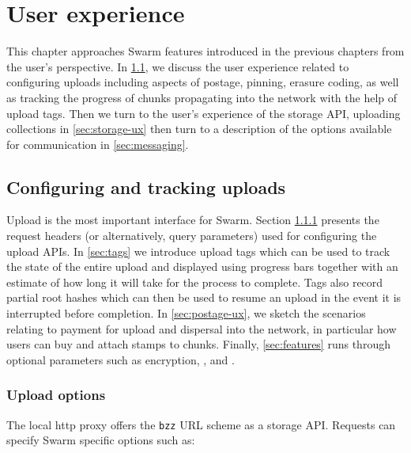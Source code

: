 \chapter{User experience}\label{sec:ux}

This chapter approaches Swarm features introduced in the previous chapters from the user's perspective. In \ref{sec:upload}, we discuss the user experience related to configuring uploads including aspects of postage, pinning, erasure coding, as well as tracking the progress of chunks propagating into the network with the help of upload tags. Then we turn to the user's experience of the storage API, uploading collections in \ref{sec:storage-ux} then turn to a description of the options available for communication in \ref{sec:messaging}.

\section{Configuring and tracking uploads \statusgreen}\label{sec:upload}

\green{}

Upload is the most important interface for Swarm. Section \ref{sec:headers} presents the request headers (or alternatively, query parameters) used for configuring the upload APIs. In \ref{sec:tags} we introduce upload tags which can be used to track the state of the entire upload and displayed using progress bars together with an estimate of how long it will take for the process to complete. Tags also record partial root hashes which can then be used to resume an upload in the event it is interrupted before completion. In \ref{sec:postage-ux}, we sketch the scenarios relating to payment for upload and dispersal into the network, in particular how users can buy and attach stamps to chunks. Finally, \ref{sec:features} runs through optional parameters such as encryption, , and .

\subsection{Upload options \statusgreen}\label{sec:headers}

The local http proxy offers the \lstinline{bzz} URL scheme as a storage API. Requests can specify Swarm specific options such as:


